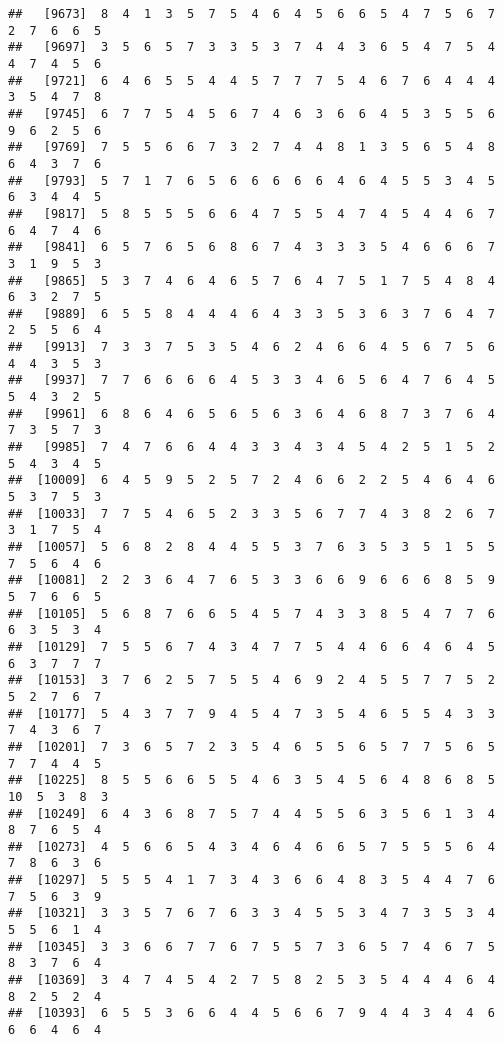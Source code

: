 \documentclass[
]{book}
\begin{document}
\begin{verbatim}
##   [9673]  8  4  1  3  5  7  5  4  6  4  5  6  6  5  4  7  5  6  7  2  7  6  6  5
##   [9697]  3  5  6  5  7  3  3  5  3  7  4  4  3  6  5  4  7  5  4  4  7  4  5  6
##   [9721]  6  4  6  5  5  4  4  5  7  7  7  5  4  6  7  6  4  4  4  3  5  4  7  8
##   [9745]  6  7  7  5  4  5  6  7  4  6  3  6  6  4  5  3  5  5  6  9  6  2  5  6
##   [9769]  7  5  5  6  6  7  3  2  7  4  4  8  1  3  5  6  5  4  8  6  4  3  7  6
##   [9793]  5  7  1  7  6  5  6  6  6  6  6  4  6  4  5  5  3  4  5  6  3  4  4  5
##   [9817]  5  8  5  5  5  6  6  4  7  5  5  4  7  4  5  4  4  6  7  6  4  7  4  6
##   [9841]  6  5  7  6  5  6  8  6  7  4  3  3  3  5  4  6  6  6  7  3  1  9  5  3
##   [9865]  5  3  7  4  6  4  6  5  7  6  4  7  5  1  7  5  4  8  4  6  3  2  7  5
##   [9889]  6  5  5  8  4  4  4  6  4  3  3  5  3  6  3  7  6  4  7  2  5  5  6  4
##   [9913]  7  3  3  7  5  3  5  4  6  2  4  6  6  4  5  6  7  5  6  4  4  3  5  3
##   [9937]  7  7  6  6  6  6  4  5  3  3  4  6  5  6  4  7  6  4  5  5  4  3  2  5
##   [9961]  6  8  6  4  6  5  6  5  6  3  6  4  6  8  7  3  7  6  4  7  3  5  7  3
##   [9985]  7  4  7  6  6  4  4  3  3  4  3  4  5  4  2  5  1  5  2  5  4  3  4  5
##  [10009]  6  4  5  9  5  2  5  7  2  4  6  6  2  2  5  4  6  4  6  5  3  7  5  3
##  [10033]  7  7  5  4  6  5  2  3  3  5  6  7  7  4  3  8  2  6  7  3  1  7  5  4
##  [10057]  5  6  8  2  8  4  4  5  5  3  7  6  3  5  3  5  1  5  5  7  5  6  4  6
##  [10081]  2  2  3  6  4  7  6  5  3  3  6  6  9  6  6  6  8  5  9  5  7  6  6  5
##  [10105]  5  6  8  7  6  6  5  4  5  7  4  3  3  8  5  4  7  7  6  6  3  5  3  4
##  [10129]  7  5  5  6  7  4  3  4  7  7  5  4  4  6  6  4  6  4  5  6  3  7  7  7
##  [10153]  3  7  6  2  5  7  5  5  4  6  9  2  4  5  5  7  7  5  2  5  2  7  6  7
##  [10177]  5  4  3  7  7  9  4  5  4  7  3  5  4  6  5  5  4  3  3  7  4  3  6  7
##  [10201]  7  3  6  5  7  2  3  5  4  6  5  5  6  5  7  7  5  6  5  7  7  4  4  5
##  [10225]  8  5  5  6  6  5  5  4  6  3  5  4  5  6  4  8  6  8  5 10  5  3  8  3
##  [10249]  6  4  3  6  8  7  5  7  4  4  5  5  6  3  5  6  1  3  4  8  7  6  5  4
##  [10273]  4  5  6  6  5  4  3  4  6  4  6  6  5  7  5  5  5  6  4  7  8  6  3  6
##  [10297]  5  5  5  4  1  7  3  4  3  6  6  4  8  3  5  4  4  7  6  7  5  6  3  9
##  [10321]  3  3  5  7  6  7  6  3  3  4  5  5  3  4  7  3  5  3  4  5  5  6  1  4
##  [10345]  3  3  6  6  7  7  6  7  5  5  7  3  6  5  7  4  6  7  5  8  3  7  6  4
##  [10369]  3  4  7  4  5  4  2  7  5  8  2  5  3  5  4  4  4  6  4  8  2  5  2  4
##  [10393]  6  5  5  3  6  6  4  4  5  6  6  7  9  4  4  3  4  4  6  6  6  4  6  4

\end{verbatim}
\end{document}
